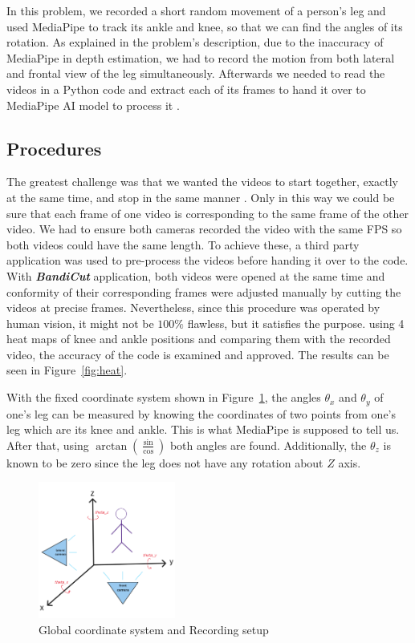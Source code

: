 \documentclass[conference]{IEEEtran}
\begin{document}
In this problem, we recorded a short random movement of a person's leg and used MediaPipe to track its ankle and knee, so that we can find the angles of its rotation. As explained in the problem's description, due to the inaccuracy of MediaPipe in depth estimation, we had to record the motion from both lateral and frontal view of the leg simultaneously. Afterwards we needed to read the videos in a Python code and extract each of its frames to hand it over to MediaPipe AI model to process it \cite{b10}.

\subsection{Procedures}
The greatest challenge was that we wanted the videos to start together, exactly at the same time, and stop in the same manner \cite{b11}. Only in this way we could be sure that each frame of one video is corresponding to the same frame of the other video. We had to ensure both cameras recorded the video with the same FPS so both videos could have the same length. To achieve these, a third party application was used to pre-process the videos before handing it over to the code. With \textbf{\textit{BandiCut}} application, both videos were opened at the same time and conformity of their corresponding frames were adjusted manually by cutting the videos at precise frames. Nevertheless, since this procedure was operated by human vision, it might not be $100\%$ flawless, but it satisfies the purpose. using 4 heat maps of knee and ankle positions and comparing them with the recorded video, the accuracy of the code is examined and approved. The results can be seen in Figure~\ref{fig:heat}.

With the fixed coordinate system shown in  Figure~\ref{fig:coordinates}, the angles $\theta_x$ and $\theta_y$ of one's leg can be measured by knowing the coordinates of two points from one's leg which are its knee and ankle. This is what MediaPipe is supposed to tell us. After that, using $\arctan(\frac{\sin}{\cos})$ both angles are found. Additionally, the $\theta_z$ is known to be zero since the leg does not have any rotation about $Z$ axis. 

\begin{figure}[htbp]
  \centerline{\includegraphics[width=0.4\textwidth]{figures/coordinates.png}}
  \caption{Global coordinate system and Recording setup}
  \label{fig:coordinates}
\end{figure}
\end{document}
